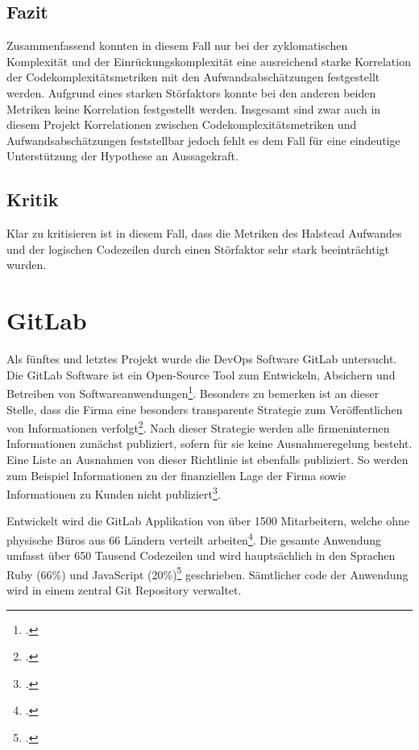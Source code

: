 \subsection{Fazit}\label{engelmanii-fazit}

Zusammenfassend konnten in diesem Fall nur bei der zyklomatischen
Komplexität und der Einrückungskomplexität eine ausreichend starke
Korrelation der Codekomplexitätsmetriken mit den Aufwandsabschätzungen
festgestellt werden. Aufgrund eines starken Störfaktors konnte bei den
anderen beiden Metriken keine Korrelation festgestellt werden. Insgesamt
sind zwar auch in diesem Projekt Korrelationen zwischen
Codekomplexitätsmetriken und Aufwandsabschätzungen feststellbar jedoch
fehlt es dem Fall für eine eindeutige Unterstützung der Hypothese an
Aussagekraft.

\subsection{Kritik}\label{engelmanii-kritik}

Klar zu kritisieren ist in diesem Fall, dass die Metriken des Halstead
Aufwandes und der logischen Codezeilen durch einen Störfaktor sehr stark
beeinträchtigt wurden.

\section{GitLab}\label{GitLab}

Als fünftes und letztes Projekt wurde die DevOps Software GitLab
untersucht. Die GitLab Software ist ein Open-Source Tool zum Entwickeln,
Absichern und Betreiben von Softwareanwendungen\footcite[Vgl. ][]{GitLab14Delivers2021}.
Besonders zu bemerken ist an dieser Stelle, dass die Firma eine
besonders transparente Strategie zum Veröffentlichen von Informationen
verfolgt\footcite[Vgl. ][]{GitLabValues}. Nach dieser Strategie werden alle
firmeninternen Informationen zunächst publiziert, sofern für sie keine
Ausnahmeregelung besteht. Eine Liste an Ausnahmen von dieser Richtlinie
ist ebenfalls publiziert. So werden zum Beispiel Informationen zu der
finanziellen Lage der Firma sowie Informationen zu Kunden nicht
publiziert\footcite[Vgl. ][]{GitLabCommunication}.

Entwickelt wird die GitLab Applikation von über 1500 Mitarbeitern,
welche ohne physische Büros aus 66 Ländern verteilt arbeiten\footcite[Vgl. ][]{GitLabGitLab}.
Die gesamte Anwendung umfasst über 650 Tausend Codezeilen und wird hauptsächlich in den Sprachen Ruby (66\%) und
JavaScript (20\%)\footcite[Vgl. ][]{GitLabOrgGitLab} geschrieben. Sämtlicher code
der Anwendung wird in einem zentral Git Repository verwaltet.

